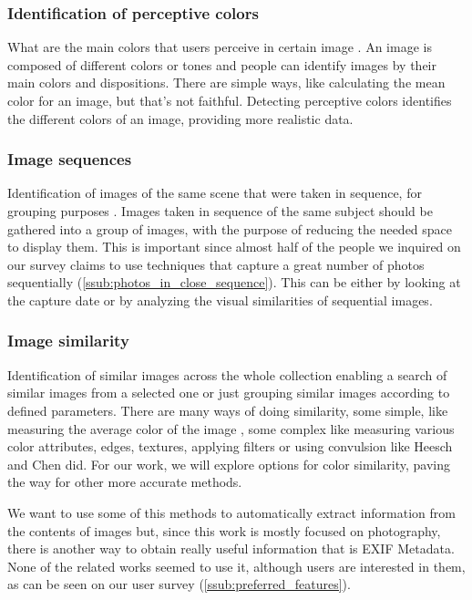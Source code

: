 	
\subsubsection{Identification of perceptive colors}
What are the main colors that users perceive in certain image \cite{Sural:2002bt,Tan:2001p850}. An image is composed of different colors or tones and people can identify images by their main colors and dispositions. There are simple ways, like calculating the mean color for an image, but that's not faithful. Detecting perceptive colors identifies the different colors of an image, providing more realistic data.

\subsubsection{Image sequences}
Identification of images of the same scene that were taken in sequence, for grouping purposes \cite{Cooper:2003p3679}. Images taken in sequence of the same subject should be gathered into a group of images, with the purpose of reducing the needed space to display them. This is important since almost half of the people we inquired on our survey claims to use techniques that capture a great number of photos sequentially (\ref{ssub:photos_in_close_sequence}). This can be either by looking at the capture date or by analyzing the visual similarities of sequential images.

\subsubsection{Image similarity}
Identification of similar images across the whole collection enabling a search of similar images from a selected one or just grouping similar images according to defined parameters. There are many ways of doing similarity, some simple, like measuring the average color of the image \cite{Strong:2009p413,Qiu:2007p1207,Schaefer:2010p1871}, some complex like measuring various color attributes, edges, textures, applying filters or using convulsion like Heesch \cite{Heesch:2004p2675} and Chen \cite{Chen:1998p2344} did. For our work, we will explore options for color similarity, paving the way for other more accurate methods.

\vspace{0.5\baselineskip}

We want to use some of this methods to automatically extract information from the contents of images but, since this work is mostly focused on photography, there is another way to obtain really useful information that is EXIF Metadata. None of the related works seemed to use it, although users are interested in them, as can be seen on our user survey (\ref{ssub:preferred_features}).

